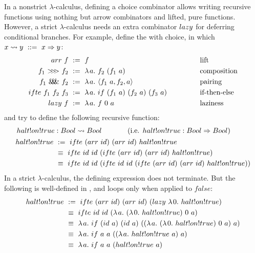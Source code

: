 In a nonstrict $\lambda$-calculus, defining a choice combinator allows writing recursive functions using nothing but arrow combinators and lifted, pure functions.
However, a strict $\lambda$-calculus needs an extra combinator $lazy$ for deferring conditional branches.
For example, define the  with choice, in which $x \rightsquigarrow y\ ::=\ x \Rightarrow y$:
\begin{equation}
\begin{aligned}
	arr~f &\ := \ f &&\text{lift}\\
	f_1~{>}\mspace{-6mu}{>}\mspace{-6mu}{>}~f_2 &\ := \ \lambda\mspace{2mu}{a}\ldotp\, f_2~(f_1~a) &&\text{composition}\\
	f_1~\mathit{\&\mspace{-7.5mu}\&\mspace{-7.5mu}\&}~f_2 &\ := \ \lambda\mspace{2mu}{a}\ldotp\, \langle{f_1~a,f_2,a}\rangle &&\text{pairing} \\
	ifte~f_1~f_2~f_3 &\ := \ \lambda\mspace{2mu}{a}\ldotp\, if~(f_1~a)~(f_2~a)~(f_3~a) \hspace{0.5in} &&\text{if-then-else} \\
	lazy~f &\ :=\ \lambda\mspace{2mu}{a}\ldotp\, f~0~a &&\text{laziness}
\end{aligned}
\label{eqn:function-arrow}
\end{equation}
and try to define the following recursive function:
\begin{equation}
\begin{aligned}
	&\,halt!on!true : Bool \arrow Bool \hspace{0.5in} \text{(i.e. $halt!on!true : Bool \tto Bool$)}
	\\
	&\begin{aligned}
		halt!on!true &\ := \ \arrowif~(\arrowarr~id)~(\arrowarr~id)~halt!on!true
	\\
		&\ \equiv\ \arrowif~id~id~(\arrowif~(\arrowarr~id)~(\arrowarr~id)~halt!on!true)
	\\
		&\ \equiv\ \arrowif~id~id~(\arrowif~id~id~(\arrowif~(\arrowarr~id)~(\arrowarr~id)~halt!on!true))
	\end{aligned}
\end{aligned}
\end{equation}
In a strict $\lambda$-calculus, the defining expression does not terminate.
But the following is well-defined in \lzfclang, and loops only when applied to $false$:
\begin{equation}
\begin{aligned}
	halt!on!true &\ := \ \arrowif~(\arrowarr~id)~(\arrowarr~id)~(\arrowlazy~\fun{0}{halt!on!true})
	\\
		&\ \equiv\ \arrowif~id~id~(\fun{a} (\fun{0} halt!on!true)~0~a)
	\\
		&\ \equiv\ \fun{a} if~(id~a)~(id~a)~((\fun{a} (\fun{0} halt!on!true)~0~a)~a)
	\\
		&\ \equiv\ \fun{a} if~a~a~((\fun{a} halt!on!true~a)~a)
	\\
		&\ \equiv\ \fun{a} if~a~a~(halt!on!true~a)
\end{aligned}
\end{equation}

